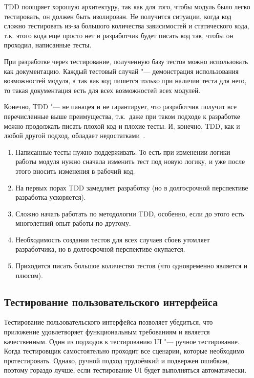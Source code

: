 TDD поощряет хорошую архитектуру, так как для того, чтобы модуль было легко тестировать, он должен быть изолирован.
Не получится ситуации, когда код сложно тестировать из-за большого количества зависимостей и статического кода, т.к. этого кода еще просто нет и разработчик будет писать код так, чтобы он проходил, написанные тесты.

При разработке через тестирование, полученную базу тестов можно использовать как документацию.
Каждый тестовый случай "--- демонстрация использования возможностей модуля, а так как код пишется только при наличии теста для него, то такая документация есть для всех возможностей всех модулей.

Конечно, TDD "--- не панацея и не гарантирует, что разработчик получит все перечисленные выше преимущества, т.к.\ даже при таком подходе к разработке можно продолжать писать плохой код и плохие тесты.
И, конечно, TDD, как и любой другой подход, обладает недостатками~\cite{tdd}.

\begin{enumerate}
  \item Написанные тесты нужно поддерживать.
То есть при изменении логики работы модуля нужно сначала изменить тест под новую логику, и уже после этого вносить изменения в рабочий код.
  \item На первых порах TDD замедляет разработку (но в долгосрочной перспективе разработка ускоряется).
  \item Сложно начать работать по методологии TDD, особенно, если до этого есть многолетний опыт работы по-другому.
  \item Необходимость создания тестов для всех случаев сбоев утомляет разработчика, но в долгосрочной перспективе окупается.
  \item Приходится писать большое количество тестов (что одновременно является и плюсом).
\end{enumerate}

\subsection{Тестирование пользовательского интерфейса}
\label{subsec:testing:ui}

Тестирование пользовательского интерфейса позволяет убедиться, что приложение удовлетворяет функциональным требованиям и является качественным.
Один из подходов к тестированию UI "--- ручное тестирование.
Когда тестировщик самостоятельно проходит все сценарии, которые необходимо протестировать.
Однако, ручной подход трудоёмкий и подвержен ошибкам, поэтому гораздо лучше, если тестирование UI будет выполняться автоматически.

